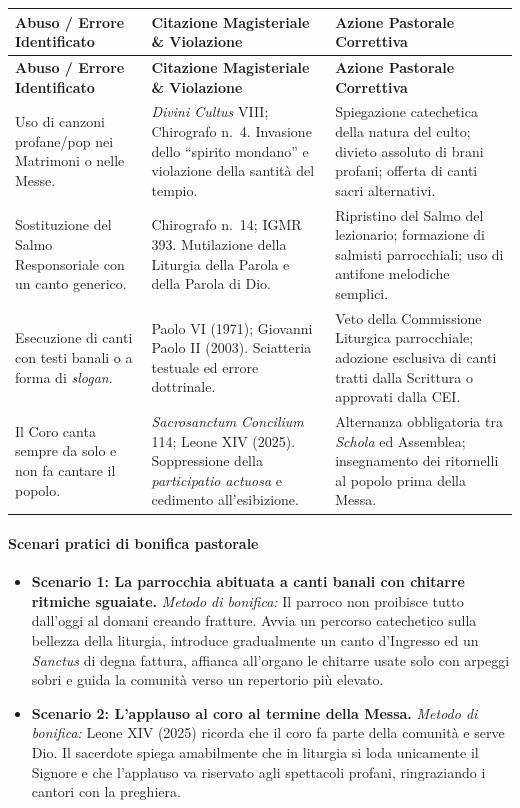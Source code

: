 \documentclass[12pt,a4paper]{article}
\begin{document}
	\begin{longtable}{L{3cm}L{4cm}L{5cm}}
		\toprule
		\textbf{Abuso / Errore Identificato} & \textbf{Citazione Magisteriale \& Violazione} & \textbf{Azione Pastorale Correttiva} \\
		\midrule
		\endfirsthead
		\toprule
		\textbf{Abuso / Errore Identificato} & \textbf{Citazione Magisteriale \& Violazione} & \textbf{Azione Pastorale Correttiva} \\
		\midrule
		\endhead
		\bottomrule
		\endlastfoot
		Uso di canzoni profane/pop nei Matrimoni o nelle Messe. & \emph{Divini Cultus} VIII; Chirografo n.~4. Invasione dello ``spirito mondano'' e violazione della santità del tempio. & Spiegazione catechetica della natura del culto; divieto assoluto di brani profani; offerta di canti sacri alternativi. \\
		Sostituzione del Salmo Responsoriale con un canto generico. & Chirografo n.~14; IGMR 393. Mutilazione della Liturgia della Parola e della Parola di Dio. & Ripristino del Salmo del lezionario; formazione di salmisti parrocchiali; uso di antifone melodiche semplici. \\
		Esecuzione di canti con testi banali o a forma di \emph{slogan}. & Paolo VI (1971); Giovanni Paolo II (2003). Sciatteria testuale ed errore dottrinale. & Veto della Commissione Liturgica parrocchiale; adozione esclusiva di canti tratti dalla Scrittura o approvati dalla CEI. \\
		Il Coro canta sempre da solo e non fa cantare il popolo. & \emph{Sacrosanctum Concilium} 114; Leone XIV (2025). Soppressione della \emph{participatio actuosa} e cedimento all'esibizione. & Alternanza obbligatoria tra \emph{Schola} ed Assemblea; insegnamento dei ritornelli al popolo prima della Messa. \\
	\end{longtable}
	
	\paragraph{Scenari pratici di bonifica pastorale}\label{scenari-pratici-di-bonifica-pastorale}
	
	\begin{itemize}[leftmargin=*]
		\item \textbf{Scenario 1: La parrocchia abituata a canti banali con chitarre ritmiche sguaiate.} \emph{Metodo di bonifica:} Il parroco non proibisce tutto dall'oggi al domani creando fratture. Avvia un percorso catechetico sulla bellezza della liturgia, introduce gradualmente un canto d'Ingresso ed un \emph{Sanctus} di degna fattura, affianca all'organo le chitarre usate solo con arpeggi sobri e guida la comunità verso un repertorio più elevato.
		\item \textbf{Scenario 2: L'applauso al coro al termine della Messa.} \emph{Metodo di bonifica:} Leone XIV (2025) ricorda che il coro fa parte della comunità e serve Dio. Il sacerdote spiega amabilmente che in liturgia si loda unicamente il Signore e che l'applauso va riservato agli spettacoli profani, ringraziando i cantori con la preghiera.
	\end{itemize}
	
\end{document}
